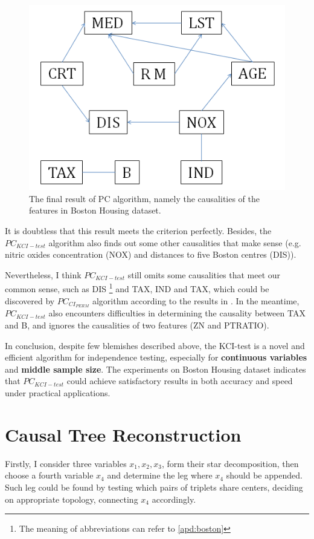 \documentclass[12pt,a4paper]{article}
\theoremstyle{definition}
\begin{document}
\begin{figure}[H]
	\centering
	\includegraphics[width=0.55\linewidth]{img/res.png}
	\caption{The final result of PC algorithm, namely the causalities of the features in Boston Housing dataset.}
	\label{fig:pc-res}
\end{figure}

\vspace{-0.01\linewidth}
It is doubtless that this result meets the criterion perfectly. Besides, the $PC_{KCI-test}$ algorithm also finds out some other causalities that make sense (e.g. nitric oxides concentration (NOX) and distances to five Boston centres (DIS)).

\vspace{0.008\linewidth}
Nevertheless, I think $PC_{KCI-test}$ still omits some causalities that meet our common sense, such as DIS \footnote{The meaning of abbreviations can refer to \ref{apd:boston}} and TAX, IND and TAX, which could be discovered by $PC_{CI_{PERM}}$ algorithm according to the results in \cite{alg}. In the meantime, $PC_{KCI-test}$ also encounters difficulties in determining the causality between TAX and B, and ignores the causalities of two features (ZN and PTRATIO). 

\vspace{0.008\linewidth}
In conclusion, despite few blemishes described above, the KCI-test is a novel and efficient algorithm for independence testing, especially for \textbf{continuous variables} and \textbf{middle sample size}. The experiments on Boston Housing dataset indicates that $PC_{KCI-test}$ could achieve satisfactory results in both accuracy and speed under practical applications.

\vspace{-0.01\linewidth}
\section{Causal Tree Reconstruction}

Firstly, I consider three variables $x_1, x_2, x_3$, form their star decomposition, then choose a fourth variable $x_4$ and determine the leg where $x_4$ should be appended. Such leg could be found by testing which pairs of triplets share centers, deciding on appropriate topology, connecting $x_4$ accordingly.
\end{document}
